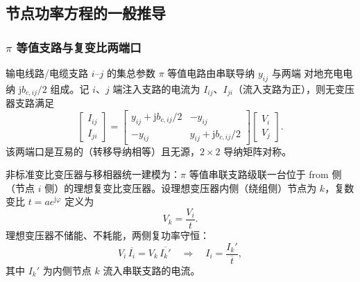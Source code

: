 \subsection{节点功率方程的一般推导}\label{sec:pf-th-fund-power-eq}

\subsubsection{\texorpdfstring{$\pi$}{π} 等值支路与复变比两端口}

\begin{definition}[$\pi$ 等值支路]\label{def:pf-th-fund-pi}
输电线路/电缆支路 $i$--$j$ 的集总参数 $\pi$ 等值电路由串联导纳 $y_{ij}$ 与两端
对地充电电纳 $\mathrm jb_{c,ij}/2$ 组成。记 $i$、$j$ 端注入支路的电流为
$I_{ij}$、$I_{ji}$（流入支路为正），则无变压器支路满足
\begin{equation}
\begin{bmatrix}I_{ij}\\ I_{ji}\end{bmatrix}
=
\begin{bmatrix}
y_{ij}+\mathrm jb_{c,ij}/2 & -y_{ij}\\
-y_{ij} & y_{ij}+\mathrm jb_{c,ij}/2
\end{bmatrix}
\begin{bmatrix}V_i\\ V_j\end{bmatrix}.
\label{eq:pf-th-fund-pi}
\end{equation}
该两端口是互易的（转移导纳相等）且无源，$2\times2$ 导纳矩阵对称。
\end{definition}

\begin{definition}\label{def:pf-th-fund-tap}
非标准变比变压器与移相器统一建模为：$\pi$ 等值串联支路级联一台位于 from 侧
（节点 $i$ 侧）的理想复变比变压器。设理想变压器内侧（绕组侧）节点为 $k$，复数变比
$t=ae^{\mathrm j\varphi}$ 定义为
\begin{equation}
V_k=\frac{V_i}{t}.
\end{equation}
理想变压器不储能、不耗能，两侧复功率守恒：
\begin{equation}
V_i\,\overline{I_i}=V_k\,\overline{I_k'}
\quad\Longrightarrow\quad
I_i=\frac{I_k'}{\overline{t}},
\label{eq:pf-th-fund-ideal}
\end{equation}
其中 $I_k'$ 为内侧节点 $k$ 流入串联支路的电流。
\end{definition}

